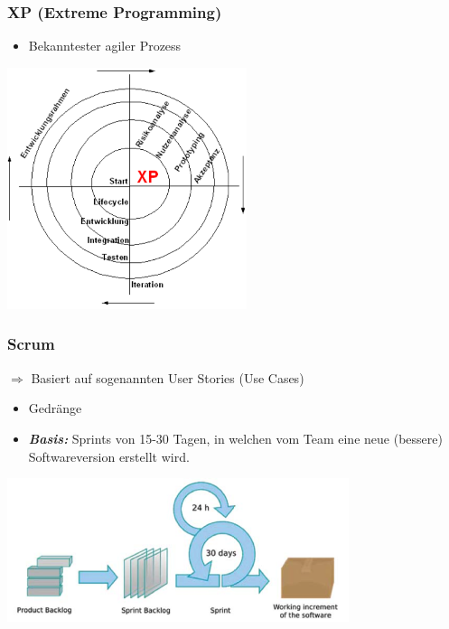 \begin{multicols}{2}
\begin{minipage}{\linewidth}
    \subsubsection{XP (Extreme Programming)}
	\begin{itemize}
		\item Bekanntester agiler Prozess
	\end{itemize}
	\includegraphics[width=7cm]{images/extreme_programming.png}
\end{minipage}

\begin{minipage}{\linewidth}
\subsubsection{Scrum}
$\Rightarrow$ Basiert auf sogenannten User Stories (Use Cases)\\
	\begin{itemize}
		\item Gedränge
		\item \textit{\textbf{Basis:}} Sprints von 15-30 Tagen, in welchen vom Team eine neue (bessere) Softwareversion erstellt wird. 
	\end{itemize}
	\includegraphics[width=10cm]{images/scrum.png}
\end{minipage}
\\
\end{multicols}


